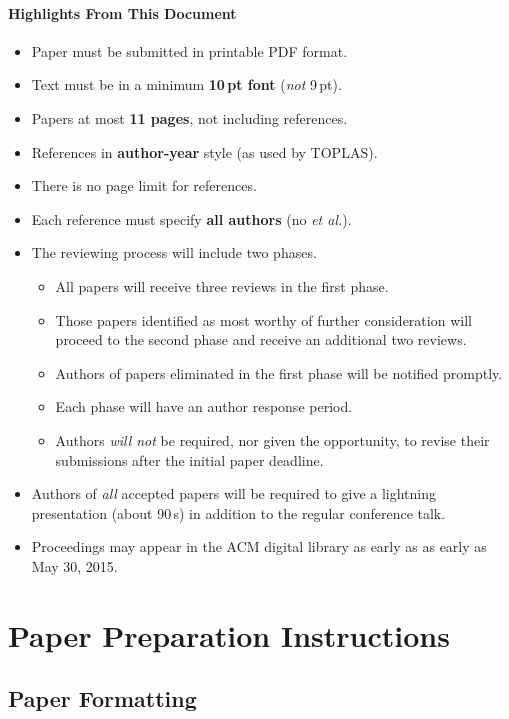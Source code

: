 \paragraph{Highlights From This Document}
\begin{itemize}[noitemsep]
\item Paper must be submitted in printable PDF format.
\item Text must be in a minimum \textbf{10\,pt font} (\emph{not} 9\,pt).
\item Papers at most \textbf{11 pages}, not including references. 
\item References in \textbf{author-year} style (as used by TOPLAS).
\item There is no page limit for references. 
\item Each reference must specify \textbf{all authors} (no \emph{et al.}). 
\item The reviewing process will include two phases.
  \begin{itemize}
  \item All papers will receive three reviews in the first phase.
  \item Those papers identified as most worthy of further consideration will proceed to the second phase and receive an additional two reviews.
  \item Authors of papers eliminated in the first phase will be notified promptly.
  \item Each phase will have an author response period.
  \item Authors \emph{will not} be required, nor given the opportunity, to revise their submissions after the initial paper deadline.
  \end{itemize}
\item Authors of \emph{all} accepted papers will be required to give a
  lightning presentation (about 90\,s) in addition to
  the regular conference talk.
\item Proceedings may appear in the ACM digital library as early as as early as May 30, 2015.
\end{itemize} 



\section{Paper Preparation Instructions}

\subsection{Paper Formatting}

